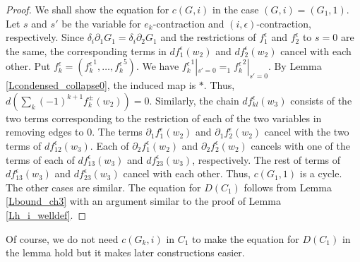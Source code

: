\documentclass[reqno]{amsart}
\theoremstyle{definition}
\theoremstyle{plain}
\newcommand{\eps}{\epsilon}
\begin{document}
\begin{proof}
We shall show the  equation for $c(G,i)$ in the case $(G,i)=(G_1,1)$. Let $s$ and $s'$ be the variable for $e_k$-contraction and $(i,\eps)$-contraction, respectively. Since $\delta_i\partial_1G_1=\delta_i\partial_2G_1$ and  the restrictions of $f_1^\eps$ and $f_2^\eps$ to $s=0$ are the same, the corresponding terms in $df_1^\eps(w_2)$ and $df_2^\eps(w_2)$ cancel with each other. Put $f^\eps_k=({f^\eps_{k}}^1,\dots,{f^\eps_{k}}^5)$. We have ${f^\eps_k}^1|_{s'=0}=_1{f^\eps_{k}}^2|_{s'=0}$. By Lemma \ref{Lcondensed_collapse0}, the induced map is $*$. Thus, $d(\sum_k(-1)^{k+1}f_k^\pm(w_2))=0$. Similarly, the chain $df^\eps_{kl}(w_3)$  consists of the two terms corresponding to the restriction of each of the two variables in removing edges to $0$. The terms $\partial_1f^\eps_1(w_2)$ and $\partial_1f_2^\eps(w_2)$ cancel with the two terms of $df^\eps_{12}(w_3)$. Each of  $\partial_2f^\eps_1(w_2)$ and $\partial_2f_2^\eps(w_2)$ cancels with one of the terms  of each of $df^\eps_{13}(w_3)$ and $df^\eps_{23}(w_3)$, respectively. The rest of  terms of $df^\eps_{13}(w_3)$ and $df^\eps_{23}(w_3)$ cancel with each other.   Thus, $c(G_1,1)$ is a cycle. The other cases are similar. The equation for $D(C_1)$ follows from Lemma \ref{Lbound_ch3} with an argument similar to the proof of Lemma \ref{Lh_i_welldef}.
\end{proof}
Of course, we do not need $c(G_k,i)$ in $C_1$ to make the equation for $D(C_1)$ in the lemma hold but  it makes later constructions easier.
\end{document}
